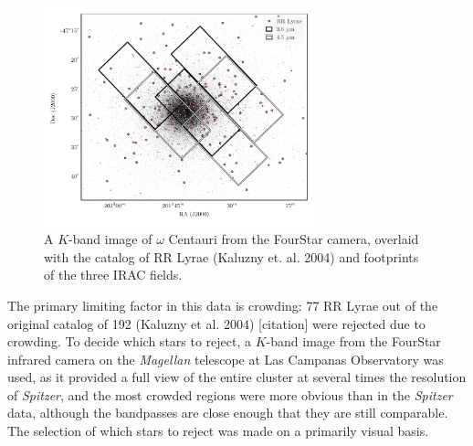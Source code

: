 \documentclass[a4paper,fleqn,usenatbib]{mnras}
\begin{document}
\begin{figure}
\begin{center}
\includegraphics[width=80mm]{final_plots/omegacen_coverage_map.pdf}
\caption{A $K$-band image of $\omega$ Centauri from the FourStar camera, overlaid with the catalog of RR Lyrae (Kaluzny et. al. 2004) and footprints of the three IRAC fields.}
\label{fig:omegaCen_fields}
\end{center}
\end{figure}



The primary limiting factor in this data is crowding: 77 RR Lyrae out of the original catalog of 192 (Kaluzny et al. 2004) [citation] were rejected due to crowding. To decide which stars to reject, a $K$-band image from the FourStar infrared camera on the \textit{Magellan} telescope at Las Campanas Observatory was used, as it provided a full view of the entire cluster at several times the resolution of \textit{Spitzer}, and the most crowded regions were more obvious than in the \textit{Spitzer} data, although the bandpasses are close enough that they are still comparable. The selection of which stars to reject was made on a primarily visual basis. %
\end{document}
